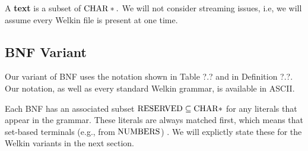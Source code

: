 


A \textbf{text} is a subset of $\mathrm{CHAR}*.$ We will not consider streaming issues, i.e, we will assume every Welkin file is present at one time.

\subsection{BNF Variant}
Our variant of BNF uses the notation shown in Table ?.? and in Definition ?.?. Our notation, as well as every standard Welkin grammar, is available in ASCII.

Each BNF has an associated subset $\mathrm{RESERVED} \subseteq \mathrm{CHAR}*$ for any literals that appear in the grammar. These literals are always matched first, which means that set-based terminals (e.g., from $\mathrm{NUMBERS}$) . We will explictly state these for the Welkin variants in the next section.

